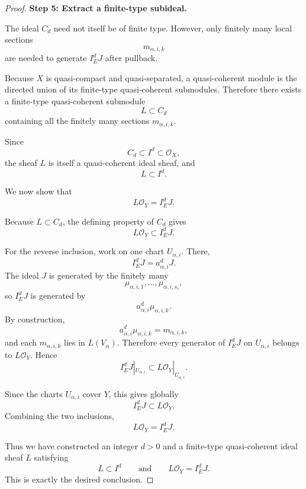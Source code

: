 \documentclass[11pt]{article}
\newcommand{\OO}{\mathcal O}
\begin{document}
\begin{proof}
\noindent
\textbf{Step 5: Extract a finite-type subideal.}

The ideal $C_d$ need not itself be of finite type.
However, only finitely many local sections
\[
  m_{\alpha,i,k}
\]
are needed to generate $I_E^dJ$ after pullback.

Because $X$ is quasi-compact and quasi-separated, a quasi-coherent module is
the directed union of its finite-type quasi-coherent submodules.
Therefore there exists a finite-type quasi-coherent submodule
\[
  L\subset C_d
\]
containing all the finitely many sections $m_{\alpha,i,k}$.

Since
\[
  C_d\subset I^d\subset \OO_X,
\]
the sheaf $L$ is itself a quasi-coherent ideal sheaf, and
\[
  L\subset I^d.
\]

We now show that
\[
  L\OO_Y=I_E^dJ.
\]

Because $L\subset C_d$, the defining property of $C_d$ gives
\[
  L\OO_Y\subset I_E^dJ.
\]

For the reverse inclusion, work on one chart $U_{\alpha,i}$.
There,
\[
  I_E^dJ
  =
  a_{\alpha,i}^dJ.
\]
The ideal $J$ is generated by the finitely many
\[
  \mu_{\alpha,i,1},\dots,\mu_{\alpha,i,s_i},
\]
so $I_E^dJ$ is generated by
\[
  a_{\alpha,i}^d\mu_{\alpha,i,k}.
\]
By construction,
\[
  a_{\alpha,i}^d\mu_{\alpha,i,k}
  =
  m_{\alpha,i,k},
\]
and each $m_{\alpha,i,k}$ lies in $L(V_\alpha)$.
Therefore every generator of $I_E^dJ$ on $U_{\alpha,i}$ belongs to
$L\OO_Y$.
Hence
\[
  I_E^dJ|_{U_{\alpha,i}}
  \subset
  L\OO_Y|_{U_{\alpha,i}}.
\]

Since the charts $U_{\alpha,i}$ cover $Y$, this gives globally
\[
  I_E^dJ\subset L\OO_Y.
\]
Combining the two inclusions,
\[
  L\OO_Y=I_E^dJ.
\]

Thus we have constructed an integer $d>0$ and a finite-type quasi-coherent
ideal sheaf $L$ satisfying
\[
  L\subset I^d
  \qquad\text{and}\qquad
  L\OO_Y=I_E^dJ.
\]
This is exactly the desired conclusion.
\end{proof}

\bigskip
\end{document}
